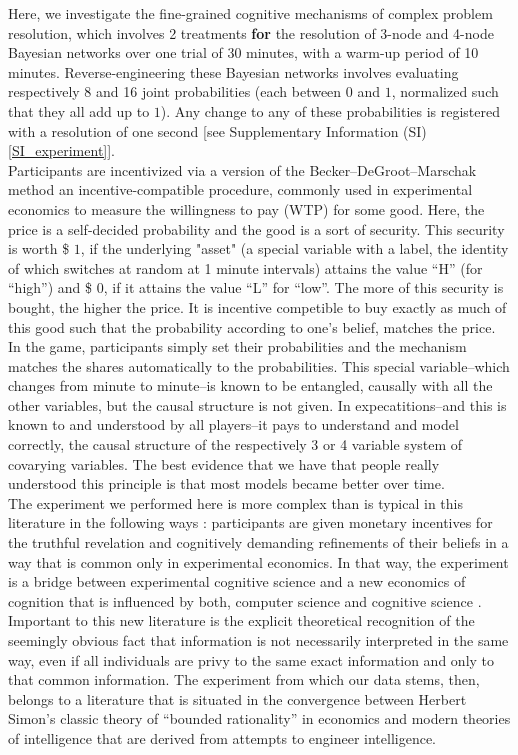 Here, we investigate the fine-grained cognitive mechanisms of complex problem resolution, which involves 2 treatments {\bf for} the resolution of 3-node and 4-node Bayesian networks over one trial of 30 minutes, with a warm-up period of 10 minutes. Reverse-engineering these Bayesian networks involves evaluating respectively 8 and 16 joint probabilities (each between $0$ and $1$, normalized such that they all add up to $1$). Any change to any of these probabilities is registered with a resolution of one second [see Supplementary Information (SI) \ref{SI_experiment}].\\

Participants are incentivized via a version of the Becker–DeGroot–Marschak method an incentive-compatible procedure, commonly used in experimental economics to measure the willingness to pay (WTP) for some good. Here, the price is a self-decided probability and the good is a sort of security.  This security is worth \$ $1$, if the underlying "asset" (a special variable with a label, the identity of which switches at random at 1 minute intervals) attains the value ``H'' (for ``high'') and \$ $0$, if it attains the value ``L'' for ``low''. The more of this security is bought, the higher the price. It is incentive competible to buy exactly as much of this good such that the probability according to one's belief, matches the price. In the game, participants simply set their probabilities and the mechanism matches the shares automatically to the probabilities.  This special variable--which changes from minute to minute--is known to be entangled, causally with all the other variables, but the causal structure is not given.  In expecatitions--and this is known to and understood by all players--it pays to understand and model correctly, the causal structure of the respectively 3 or 4 variable system of covarying variables.  The best evidence that we have that people really understood this principle is that most models became better over time.  \\

The experiment we performed here is more complex than is typical in this literature in the following ways : participants are given monetary incentives for the truthful revelation and cognitively demanding refinements of their beliefs in a way that is common only in experimental economics.  In that way, the experiment is a bridge between experimental cognitive science and a new economics of cognition that is influenced by both, computer science and cognitive science \cite{Spiegler2016}. Important to this new literature is the explicit theoretical recognition of the seemingly obvious fact that information is not necessarily interpreted in the same way, even if all individuals are privy to the same exact information and only to that common information. The experiment from which our data stems, then, belongs to a literature that is situated in the convergence between Herbert Simon's classic theory of ``bounded rationality'' in economics \cite{Gigerenzer2001, Rubinstein98, tsang2008computational, simon1955behavioral} and modern theories of intelligence that are derived from attempts to engineer intelligence.\\  

